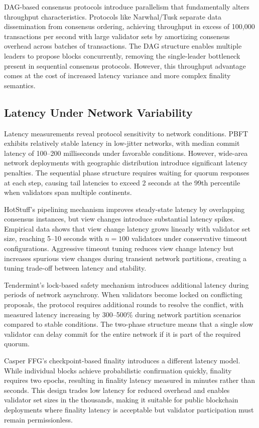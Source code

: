 DAG-based consensus protocols introduce parallelism that fundamentally alters throughput characteristics. Protocols like Narwhal/Tusk separate data dissemination from consensus ordering, achieving throughput in excess of 100,000 transactions per second with large validator sets by amortizing consensus overhead across batches of transactions. The DAG structure enables multiple leaders to propose blocks concurrently, removing the single-leader bottleneck present in sequential consensus protocols. However, this throughput advantage comes at the cost of increased latency variance and more complex finality semantics.

\subsection{Latency Under Network Variability}

Latency measurements reveal protocol sensitivity to network conditions. PBFT exhibits relatively stable latency in low-jitter networks, with median commit latency of 100--200 milliseconds under favorable conditions. However, wide-area network deployments with geographic distribution introduce significant latency penalties. The sequential phase structure requires waiting for quorum responses at each step, causing tail latencies to exceed 2 seconds at the 99th percentile when validators span multiple continents.

HotStuff's pipelining mechanism improves steady-state latency by overlapping consensus instances, but view changes introduce substantial latency spikes. Empirical data shows that view change latency grows linearly with validator set size, reaching 5--10 seconds with $n = 100$ validators under conservative timeout configurations. Aggressive timeout tuning reduces view change latency but increases spurious view changes during transient network partitions, creating a tuning trade-off between latency and stability.

Tendermint's lock-based safety mechanism introduces additional latency during periods of network asynchrony. When validators become locked on conflicting proposals, the protocol requires additional rounds to resolve the conflict, with measured latency increasing by 300--500\% during network partition scenarios compared to stable conditions. The two-phase structure means that a single slow validator can delay commit for the entire network if it is part of the required quorum.

Casper FFG's checkpoint-based finality introduces a different latency model. While individual blocks achieve probabilistic confirmation quickly, finality requires two epochs, resulting in finality latency measured in minutes rather than seconds. This design trades low latency for reduced overhead and enables validator set sizes in the thousands, making it suitable for public blockchain deployments where finality latency is acceptable but validator participation must remain permissionless.

